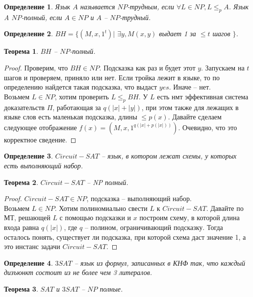 \documentclass[12pt, letterpaper]{article}
\newtheorem{theorem}{Теорема}[section]
\newtheorem{defi}{Определение}[section]
\newcommand{\leqp}{\leq_{p}}
\begin{document}
\begin{defi}
Язык $A$ называется $NP$-трудным, если $\forall L \in NP, L \leqp A$. Язык A $NP$-полный, если $A\in NP$ и $A$ -- $NP$-трудный. 
\end{defi}

\begin{defi}
$BH = \{ (M, x, 1^t) | $ $\exists y, M(x,y)$ выдает 1 за $\leq t$ шагов  $\}$. 
\end{defi}

\begin{theorem}
$BH$ -- $NP$-полный.
\end{theorem}
\begin{proof}
Проверим, что $BH \in NP$. Подсказка как раз и будет этот $y$. Запускаем на $t$ шагов и проверяем, приняло или нет. Если тройка лежит в языке, то по определению найдется такая подсказка, что выдаст $yes$. Иначе -- нет.\\
Возьмем $L \in NP$, хотим проверить $L \leqp BH$. У $L$ есть нмт эффективная система доказательств $\Pi$, работающая за $q(|x|+|y|)$, при этом также для лежащих в языке слов есть маленькая подсказка, длины $\leq p(x)$. Давайте сделаем следующее отображение $f(x) = (M, x, 1^{q(|x|+p(|x|))})$. Очевидно, что это корректное сведение.
\end{proof}

\begin{defi}
$Circuit - SAT$ -- язык, в котором лежат схемы, у которых есть выполняющий набор.
\end{defi}

\begin{theorem}
$Circuit - SAT$ -- NP полный.
\end{theorem}
\begin{proof}
$Circuit-SAT \in NP$, подсказка -- выполняющий набор. \\
Возьмем $L \in NP$. Хотим полиномиально свести $L$ к $Circuit-SAT$. Давайте по МТ, решающей $L$ с помощью подсказки и $x$ построим схему, в которой длина входа равна $q(|x|)$, где $q$ -- полином, ограничивающий подсказку. Тогда осталось понять, существует ли подсказка, при которой схема даст значение 1, а это инстанс задачи $Circuit-SAT$.
\end{proof}

\begin{defi}
$3SAT$ -- язык из формул, записанных в КНФ так, что каждый дизъюнкт состоит из не более чем 3 литералов. 
\end{defi}

\begin{theorem}
$SAT$ и $3SAT$ -- $NP$ полные.
\end{theorem}
\end{document}
